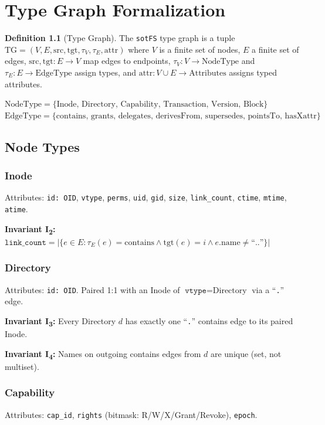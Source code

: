 \documentclass[11pt,a4paper,twoside]{report}
\theoremstyle{definition}
\newtheorem{definition}{Definition}[chapter]
\newcommand{\sotFS}{\texttt{sotFS}}
\newcommand{\TG}{\mathrm{TG}}
\begin{document}
\chapter{Type Graph Formalization}

\begin{definition}[Type Graph]
The \sotFS{} type graph is a tuple
$\TG = (V, E, \mathrm{src}, \mathrm{tgt}, \tau_V, \tau_E, \mathrm{attr})$
where $V$ is a finite set of nodes, $E$ a finite set of edges,
$\mathrm{src}, \mathrm{tgt}: E \to V$ map edges to endpoints,
$\tau_V: V \to \mathrm{NodeType}$ and $\tau_E: E \to \mathrm{EdgeType}$
assign types, and $\mathrm{attr}: V \cup E \to \mathrm{Attributes}$
assigns typed attributes.

\medskip\noindent
$\mathrm{NodeType} = \{\text{Inode, Directory, Capability, Transaction, Version, Block}\}$\\
$\mathrm{EdgeType} = \{\text{contains, grants, delegates, derivesFrom, supersedes, pointsTo, hasXattr}\}$
\end{definition}

\section{Node Types}

\subsection{Inode}
Attributes: \texttt{id:~OID}, \texttt{vtype}, \texttt{perms}, \texttt{uid}, \texttt{gid},
\texttt{size}, \texttt{link\_count}, \texttt{ctime}, \texttt{mtime}, \texttt{atime}.

\textbf{Invariant I\textsubscript{2}:} $\texttt{link\_count} = |\{e \in E : \tau_E(e)=\text{contains} \wedge \mathrm{tgt}(e)=i \wedge e.\text{name} \neq \text{``..''}\}|$

\subsection{Directory}
Attributes: \texttt{id:~OID}. Paired 1:1 with an Inode of $\texttt{vtype}=\text{Directory}$ via a ``\texttt{.}'' edge.

\textbf{Invariant I\textsubscript{3}:} Every Directory $d$ has exactly one ``\texttt{.}'' contains edge to its paired Inode.

\textbf{Invariant I\textsubscript{4}:} Names on outgoing contains edges from $d$ are unique (set, not multiset).

\subsection{Capability}
Attributes: \texttt{cap\_id}, \texttt{rights} (bitmask: R/W/X/Grant/Revoke), \texttt{epoch}.
\end{document}
